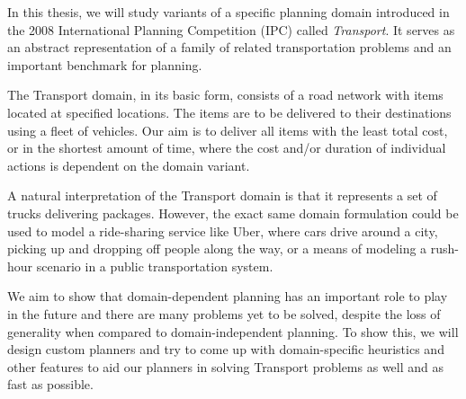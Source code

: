 \documentclass[a0paper,fontscale=0.285]{baposter} %
\begin{document}
\begin{poster}
{\begin{multicols}{2}
In this thesis, we will study variants of a specific planning domain introduced in the 2008 International Planning Competition (IPC) called \textit{Transport}. It serves as an abstract representation of a family of related transportation problems
and an important benchmark for planning.

The Transport domain, in its basic form, consists of a road network with items located at specified locations. The items are to be delivered to their destinations
using a fleet of vehicles. Our aim is to deliver all items
with the least total cost, or in the shortest amount of time,
where the cost and/or duration of individual actions is dependent on the domain variant.

A natural interpretation of the Transport domain is that it represents a set of trucks
delivering packages. However,
the exact same domain formulation could be used to
model a ride-sharing service like Uber, where cars drive around a city, picking up and dropping off people along the way, or
a means of modeling a rush-hour scenario in a public transportation system.

We aim to show that domain-dependent planning has an important
role to play in the future and there are many problems yet to be solved,
despite the loss of generality when compared to domain-independent planning.
To show this, we will design custom planners
and try to come up with domain-specific heuristics and other features
to aid our planners in solving Transport problems as well and as fast as
possible.
\end{multicols}
}


\end{poster}
\end{document}
